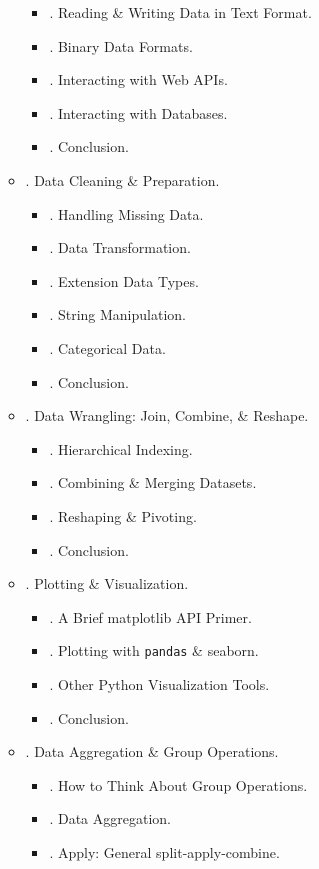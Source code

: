 \documentclass{article}
\begin{document}
\begin{enumerate}
\begin{itemize}
\begin{itemize}
			\item {. Reading \& Writing Data in Text Format.}
			\item {. Binary Data Formats.}
			\item {. Interacting with Web APIs.}
			\item {. Interacting with Databases.}
			\item {. Conclusion.}
		\end{itemize}
		\item {. Data Cleaning \& Preparation.}
		\begin{itemize}
			\item {. Handling Missing Data.}
			\item {. Data Transformation.}
			\item {. Extension Data Types.}
			\item {. String Manipulation.}
			\item {. Categorical Data.}
			\item {. Conclusion.}
		\end{itemize}
		\item {. Data Wrangling: Join, Combine, \& Reshape.}
		\begin{itemize}
			\item {. Hierarchical Indexing.}
			\item {. Combining \& Merging Datasets.}
			\item {. Reshaping \& Pivoting.}
			\item {. Conclusion.}
		\end{itemize}
		\item {. Plotting \& Visualization.}
		\begin{itemize}
			\item {. A Brief matplotlib API Primer.}
			\item {. Plotting with {\tt pandas} \& seaborn.}
			\item {. Other Python Visualization Tools.}
			\item {. Conclusion.}
		\end{itemize}
		\item {. Data Aggregation \& Group Operations.}
		\begin{itemize}
			\item {. How to Think About Group Operations.}
			\item {. Data Aggregation.}
			\item {. Apply: General split-apply-combine.}

\end{itemize}
\end{itemize}
\end{enumerate}
\end{document}
